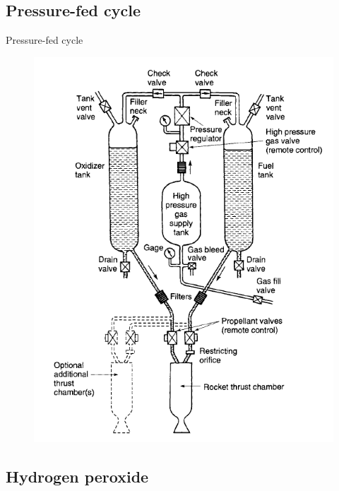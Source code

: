 \documentclass{beamer}
\begin{document}
\subsection{Pressure-fed cycle}
\begin{frame}{Pressure-fed cycle}
    \begin{figure}[t]
        \centering
        \includegraphics[height=0.84\textheight]{images/pressure_fed_cycle.png}    
    \end{figure}
\end{frame}

\subsection{Hydrogen peroxide}
\end{document}
